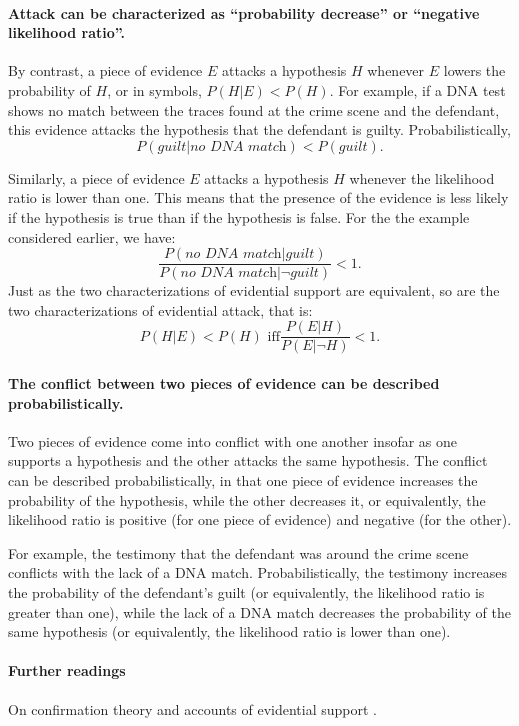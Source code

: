 \documentclass[10pt]{article}
\begin{document}
\paragraph{Attack can be characterized as ``probability decrease'' or ``negative likelihood ratio''.} 

By contrast, a piece of evidence $E$ attacks a hypothesis $H$ whenever $E$ lowers 
the probability of $H$, or in symbols, $P(H|E) < P(H)$.
For example, if a DNA test shows no match between the traces found at the crime
 scene and the defendant, this evidence attacks the hypothesis that the defendant is guilty. 
 Probabilistically, 
%
\[ P(\textit{guilt}|\textit{no DNA match}) < P(\textit{guilt}).\]  
%

Similarly, a piece of evidence $E$ attacks a hypothesis $H$ whenever 
the likelihood ratio is lower than one. This means that the presence of the evidence is less likely %
if the hypothesis is true than if the hypothesis is false. For the the example 
considered earlier, we have:
 \[\frac{P(\textit{no DNA match}|\textit{guilt})}{P(\textit{no DNA match}|\neg \textit{guilt})} < 1.\]
%
Just as the two characterizations 
of evidential support are equivalent, so are the two characterizations of evidential attack, 
that is:
\[ P(H|E) < P(H) \text{ iff}  \frac{P(E|H)}{P(E|\neg H)} < 1.\]
%

\paragraph{The conflict between two pieces of evidence can be described probabilistically.}
Two pieces of evidence come into 
conflict with one another insofar as one supports a hypothesis 
and the other attacks the same hypothesis. 
The conflict can be described probabilistically, in that one piece of evidence increases 
the probability of the hypothesis, while the other decreases it, or equivalently, the likelihood ratio is positive (for one piece 
of evidence) and negative (for the other). 

For example, the testimony that the defendant was around the crime scene conflicts 
with the lack of a DNA match. Probabilistically, the testimony 
increases the probability of the defendant's guilt (or equivalently, the likelihood ratio is greater than one),
while the lack of a DNA match decreases the probability of the same hypothesis 
(or equivalently, the likelihood ratio is lower than one).

\paragraph{Further readings} 
On confirmation theory and accounts of evidential support \citep{carnap1950, fitelson1999, crupi2015}.
\end{document}
